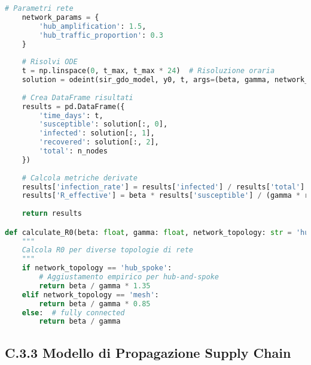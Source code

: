 \begin{lstlisting}[language=Python, caption=Modello SIR Adattato per Reti GDO]
    # Parametri rete
    network_params = {
        'hub_amplification': 1.5,
        'hub_traffic_proportion': 0.3
    }
    
    # Risolvi ODE
    t = np.linspace(0, t_max, t_max * 24)  # Risoluzione oraria
    solution = odeint(sir_gdo_model, y0, t, args=(beta, gamma, network_params))
    
    # Crea DataFrame risultati
    results = pd.DataFrame({
        'time_days': t,
        'susceptible': solution[:, 0],
        'infected': solution[:, 1],
        'recovered': solution[:, 2],
        'total': n_nodes
    })
    
    # Calcola metriche derivate
    results['infection_rate'] = results['infected'] / results['total']
    results['R_effective'] = beta * results['susceptible'] / (gamma * results['total'])
    
    return results

def calculate_R0(beta: float, gamma: float, network_topology: str = 'hub_spoke') -> float:
    """
    Calcola R0 per diverse topologie di rete
    """
    if network_topology == 'hub_spoke':
        # Aggiustamento empirico per hub-and-spoke
        return beta / gamma * 1.35
    elif network_topology == 'mesh':
        return beta / gamma * 0.85
    else:  # fully connected
        return beta / gamma
\end{lstlisting}

\subsection{C.3.3 Modello di Propagazione Supply Chain}


